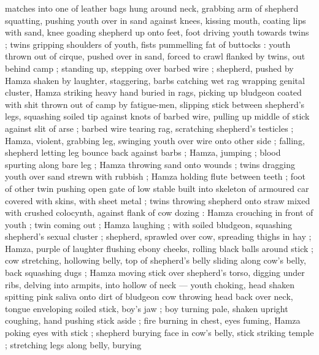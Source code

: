 matches into one of leather bags hung around neck, grabbing arm of shepherd squatting, pushing youth over in sand against knees, kissing mouth, coating lips with sand, knee goading shepherd up onto feet, foot driving youth towards twins ; twins gripping shoulders of youth, fists pummelling fat of buttocks : youth thrown out of cirque, pushed over in sand, forced to crawl flanked by twins, out behind camp ; standing up, stepping over barbed wire ; shepherd, pushed by Hamza shaken by laughter, staggering, barbs catching wet rag wrapping genital cluster, Hamza striking heavy hand buried in rags, picking up bludgeon coated with shit thrown out of camp by fatigue-men, slipping stick between shepherd's legs, squashing soiled tip against knots of barbed wire, pulling up middle of stick against slit of arse ; barbed wire tearing rag, scratching shepherd's testicles ; Hamza, violent, grabbing leg, swinging youth over wire onto other side ; falling, shepherd letting leg bounce back against barbs ; Hamza, jumping ; blood spurting along bare leg ; Hamza throwing sand onto wounds ; twins dragging youth over sand strewn with rubbish ; Hamza holding flute between teeth ; foot of other twin pushing open gate of low stable built into skeleton of armoured car covered with skins, with sheet metal ; twins throwing shepherd onto straw mixed with crushed colocynth, against flank of cow dozing : Hamza crouching in front of youth ; twin coming out ; Hamza laughing ; with soiled bludgeon, squashing shepherd's sexual cluster ; shepherd, sprawled over cow, spreading thighs in hay ; Hamza, purple of laughter flushing ebony cheeks, rolling black balls around stick ; cow stretching, hollowing belly, top of shepherd's belly sliding along cow's belly, back squashing dugs ; Hamza moving stick over shepherd's torso, digging under ribs, delving into armpits, into hollow of neck --- youth choking, head shaken spitting pink saliva onto dirt of bludgeon {\dashsemi} cow throwing head back over neck, tongue enveloping soiled stick, boy's jaw ; boy turning pale, shaken upright coughing, hand pushing stick aside ; fire burning in chest, eyes fuming, Hamza poking eyes with stick ; shepherd burying face in cow's belly, stick striking temple ; stretching legs along belly, burying 
